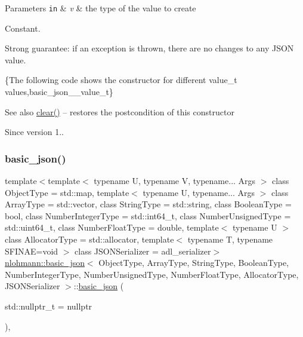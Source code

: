 \begin{DoxyParams}[1]{Parameters}
\mbox{\tt in}  & {\em v} & the type of the value to create\\
\hline
\end{DoxyParams}
Constant.

Strong guarantee\+: if an exception is thrown, there are no changes to any J\+S\+ON value.

\{The following code shows the constructor for different value\+\_\+t values,basic\+\_\+json\+\_\+\+\_\+value\+\_\+t\}

\begin{DoxySeeAlso}{See also}
\mbox{\hyperlink{classnlohmann_1_1basic__json_abfeba47810ca72f2176419942c4e1952}{clear()}} -- restores the postcondition of this constructor
\end{DoxySeeAlso}
\begin{DoxySince}{Since}
version 1.. 
\end{DoxySince}
\mbox{\label{classnlohmann_1_1basic__json_ae9be9e956bfc4658f35d17c6aa72b063}} 
\subsubsection{\texorpdfstring{basic\+\_\+json()}{basic\_json()}\hspace{0.1cm}{\footnotesize\ttfamily [2/8]}}
{\footnotesize\ttfamily template$<$template$<$ typename U, typename V, typename... Args $>$ class Object\+Type = std\+::map, template$<$ typename U, typename... Args $>$ class Array\+Type = std\+::vector, class String\+Type  = std\+::string, class Boolean\+Type  = bool, class Number\+Integer\+Type  = std\+::int64\+\_\+t, class Number\+Unsigned\+Type  = std\+::uint64\+\_\+t, class Number\+Float\+Type  = double, template$<$ typename U $>$ class Allocator\+Type = std\+::allocator, template$<$ typename T, typename S\+F\+I\+N\+A\+E=void $>$ class J\+S\+O\+N\+Serializer = adl\+\_\+serializer$>$ \\
\mbox{\hyperlink{classnlohmann_1_1basic__json}{nlohmann\+::basic\+\_\+json}}$<$ Object\+Type, Array\+Type, String\+Type, Boolean\+Type, Number\+Integer\+Type, Number\+Unsigned\+Type, Number\+Float\+Type, Allocator\+Type, J\+S\+O\+N\+Serializer $>$\+::\mbox{\hyperlink{classnlohmann_1_1basic__json}{basic\+\_\+json}} (\begin{DoxyParamCaption}\item[{std\+::nullptr\+\_\+t}]{ = {\ttfamily nullptr} }\end{DoxyParamCaption})\hspace{0.3cm}{\ttfamily [inline]}, {\ttfamily [noexcept]}}



